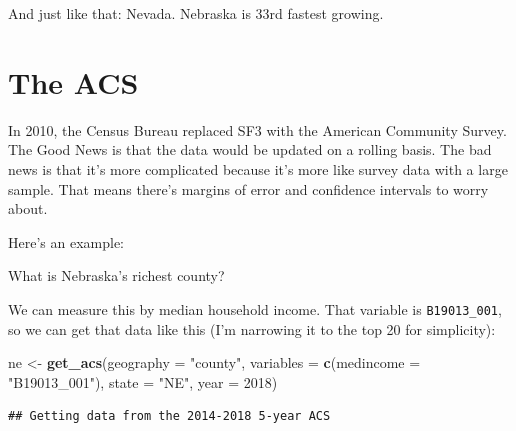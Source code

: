 \documentclass[]{book}
\newenvironment{Shaded}{\begin{snugshade}}{\end{snugshade}}
\newcommand{\DataTypeTok}[1]{\textcolor[rgb]{0.13,0.29,0.53}{#1}}
\newcommand{\DecValTok}[1]{\textcolor[rgb]{0.00,0.00,0.81}{#1}}
\newcommand{\KeywordTok}[1]{\textcolor[rgb]{0.13,0.29,0.53}{\textbf{#1}}}
\newcommand{\NormalTok}[1]{#1}
\newcommand{\OperatorTok}[1]{\textcolor[rgb]{0.81,0.36,0.00}{\textbf{#1}}}
\newcommand{\StringTok}[1]{\textcolor[rgb]{0.31,0.60,0.02}{#1}}
\begin{document}
And just like that: Nevada. Nebraska is 33rd fastest growing.

\hypertarget{the-acs}{%
\section{The ACS}\label{the-acs}}

In 2010, the Census Bureau replaced SF3 with the American Community Survey. The Good News is that the data would be updated on a rolling basis. The bad news is that it's more complicated because it's more like survey data with a large sample. That means there's margins of error and confidence intervals to worry about.

Here's an example:

What is Nebraska's richest county?

We can measure this by median household income. That variable is \texttt{B19013\_001}, so we can get that data like this (I'm narrowing it to the top 20 for simplicity):

\begin{Shaded}
\begin{Highlighting}[]
\NormalTok{ne <-}\StringTok{ }\KeywordTok{get_acs}\NormalTok{(}\DataTypeTok{geography =} \StringTok{"county"}\NormalTok{, }
              \DataTypeTok{variables =} \KeywordTok{c}\NormalTok{(}\DataTypeTok{medincome =} \StringTok{"B19013_001"}\NormalTok{), }
              \DataTypeTok{state =} \StringTok{"NE"}\NormalTok{, }
              \DataTypeTok{year =} \DecValTok{2018}\NormalTok{)}
\end{Highlighting}
\end{Shaded}

\begin{verbatim}
## Getting data from the 2014-2018 5-year ACS
\end{verbatim}

\begin{Shaded}
\end{Shaded}
\end{document}
